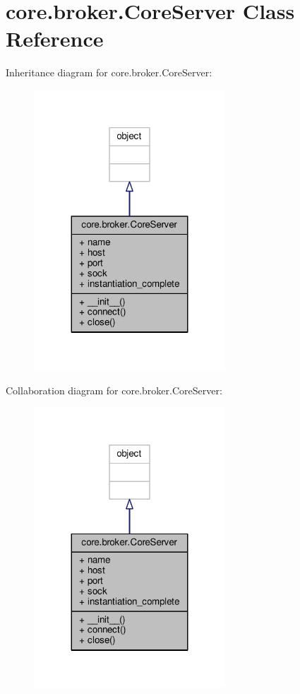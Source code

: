 \hypertarget{classcore_1_1broker_1_1_core_server}{\section{core.\+broker.\+Core\+Server Class Reference}
\label{classcore_1_1broker_1_1_core_server}
}


Inheritance diagram for core.\+broker.\+Core\+Server\+:
\nopagebreak
\begin{figure}[H]
\begin{center}
\leavevmode
\includegraphics[width=203pt]{classcore_1_1broker_1_1_core_server__inherit__graph}
\end{center}
\end{figure}


Collaboration diagram for core.\+broker.\+Core\+Server\+:
\nopagebreak
\begin{figure}[H]
\begin{center}
\leavevmode
\includegraphics[width=203pt]{classcore_1_1broker_1_1_core_server__coll__graph}
\end{center}
\end{figure}
